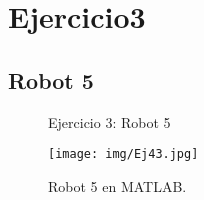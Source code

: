 \section{\textbf{Ejercicio3}}
\subsection{\textbf{Robot 5}}
\begin{figure}[H]
	\centering
	\hfill
	\caption{Ejercicio 3: Robot 5}
	\label{fig:Robot}
\end{figure}

	\begin{figure}[H]
	\centering
	\texttt{[image: img/Ej43.jpg]}
	\caption{Robot 5 en MATLAB.}
	\label{fig:Robot3matlab}
\end{figure}